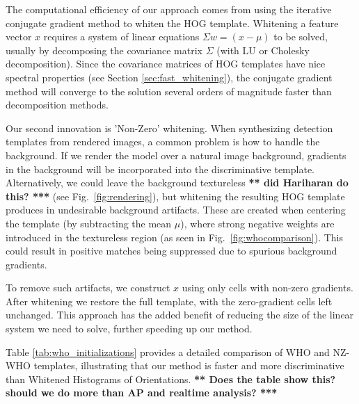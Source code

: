 \documentclass[10pt,twocolumn,letterpaper]{article}
\newcommand{\scream}[1]{{\color{red} \bf *** #1 ***}}
\begin{document}
The computational efficiency of our approach comes from using the iterative
conjugate gradient method to whiten the HOG template. Whitening a feature
vector $x$ requires a system of linear equations $\Sigma w = (x - \mu)$ to be
solved, usually by decomposing the covariance matrix $\Sigma$ (with LU or
Cholesky decomposition). Since the covariance matrices of HOG templates have
nice spectral properties (see Section \ref{sec:fast_whitening}), the conjugate
gradient method will converge to the solution several orders of magnitude
faster than decomposition methods.

Our second innovation is 'Non-Zero' whitening. When synthesizing detection
templates from rendered images, a common problem is how to handle the
background. If we render the model over a natural image background, gradients
in the background will be incorporated into the discriminative template.
Alternatively, we could leave the background textureless \scream{did Hariharan
do this?} (see Fig.~\ref{fig:rendering}), but whitening the resulting HOG
template produces in undesirable background artifacts. These are created when
centering the template (by subtracting the mean $\mu$), where strong negative
weights are introduced in the textureless region (as seen in
Fig.~\ref{fig:whocomparison}). This could result in positive matches being
suppressed due to spurious background gradients.

To remove such artifacts, we construct $x$ using only cells with non-zero
gradients. After whitening we restore the full template, with the zero-gradient
cells left unchanged. This approach has the added benefit of reducing the size
of the linear system we need to solve, further speeding up our method.

Table \ref{tab:who_initializations} provides a detailed comparison of WHO and
NZ-WHO templates, illustrating that our method is faster and more
discriminative than Whitened Histograms of Orientations. \scream{Does the table
show this? should we do more than AP and realtime analysis?}


\end{document}
